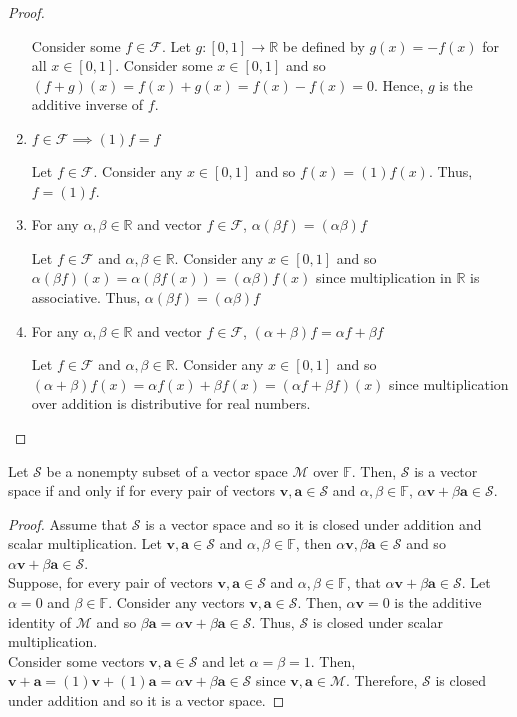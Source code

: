 \documentclass[12pt]{article}
\newcommand{\R}{\mathbb{R}}
\newenvironment{lemma}[2][Lemma]{\begin{trivlist} \item[\hskip \labelsep {\bfseries #1}\hskip \labelsep {\bfseries #2.}]}{\end{trivlist}}
\newenvironment{problem}[2][Problem]{\begin{trivlist} \item[\hskip \labelsep {\bfseries #1}\hskip \labelsep {\bfseries #2.}]}{\end{trivlist}}
\begin{document}
\begin{problem}{1.5}
\begin{proof}
\begin{enumerate}
	  Consider some $f\in \mathcal{F}$. Let $g:[0,1]\to \R$ be defined by $g(x) = -f(x)$ for all $x\in [0,1]$. Consider some $x\in [0,1]$ and so $(f+g)(x) = f(x) + g(x) = f(x) -f(x) = 0$. Hence, $g$ is the additive inverse of $f$.
	\item $f \in \mathcal{F} \implies (1)f = f$
	  
	  Let $f\in \mathcal{F}$. Consider any $x\in[0,1]$ and so $f(x) = (1)f(x)$. Thus, $f = (1)f$. 
      \item For any $\alpha,\beta \in \R$ and vector $f \in \mathcal{F}$, $\alpha(\beta f) = (\alpha\beta) f$

       Let $f\in \mathcal{F}$ and $\alpha,\beta \in \R$. Consider any $x\in[0,1]$ and so $\alpha(\beta f)(x) = \alpha(\beta f(x)) = (\alpha\beta)f(x)$ since multiplication in $\R$ is associative. Thus, $\alpha(\beta f) = (\alpha \beta)f$
      \item For any $\alpha,\beta \in \R$ and vector $f \in \mathcal{F}$, $(\alpha + \beta) f = \alpha f + \beta f$

	Let $f\in \mathcal{F}$ and $\alpha,\beta \in \R$. Consider any $x\in [0,1]$ and so $(\alpha + \beta)f(x) = \alpha f(x) + \beta f(x) = (\alpha f + \beta f)(x)$ since multiplication over addition is distributive for real numbers.
    \end{enumerate}
    \end{proof}
    \end{problem}
    \begin{lemma}{1}
      Let $\mathcal{S}$ be a nonempty subset of a vector space $\mathcal{M}$ over $\mathbb{F}$. Then, $\mathcal{S}$ is a vector space if and only if for every pair of vectors $\mathbf{v}, \mathbf{a} \in \mathcal{S}$ and $\alpha, \beta\in \mathbb{F}$, $\alpha \mathbf{v} + \beta \mathbf{a} \in \mathcal{S}$.
    \end{lemma}
    \begin{proof}
	Assume that $\mathcal{S}$ is a vector space and so it is closed under addition and scalar multiplication. Let $\mathbf{v},\mathbf{a} \in \mathcal{S}$ and $\alpha, \beta \in \mathbb{F}$, then $\alpha \mathbf{v}, \beta \mathbf{a} \in \mathcal{S}$ and so $\alpha \mathbf{v} + \beta \mathbf{a} \in \mathcal{S}$.\\
	Suppose, for every pair of vectors $\mathbf{v}, \mathbf{a} \in \mathcal{S}$ and $\alpha, \beta\in \mathbb{F}$, that $\alpha \mathbf{v} + \beta \mathbf{a} \in \mathcal{S}$. Let $\alpha = 0$ and $\beta\in \mathbb{F}$. Consider any vectors $\mathbf{v},\mathbf{a} \in \mathcal{S}$. Then, $\alpha \mathbf{v} = 0$ is the additive identity of $\mathcal{M}$ and so $\beta\mathbf{a} = \alpha \mathbf{v} + \beta\mathbf{a} \in \mathcal{S}$. Thus, $\mathcal{S}$ is closed under scalar multiplication.\\
	Consider some vectors $\mathbf{v},\mathbf{a}\in \mathcal{S}$ and let $\alpha = \beta = 1$. Then, $\mathbf{v} + \mathbf{a} = (1)\mathbf{v} + (1)\mathbf{a} = \alpha\mathbf{v} + \beta \mathbf{a} \in \mathcal{S}$ since $\mathbf{v}, \mathbf{a} \in \mathcal{M}$. Therefore, $\mathcal{S}$ is closed under addition and so it is a vector space.
    \end{proof}
\end{document}
